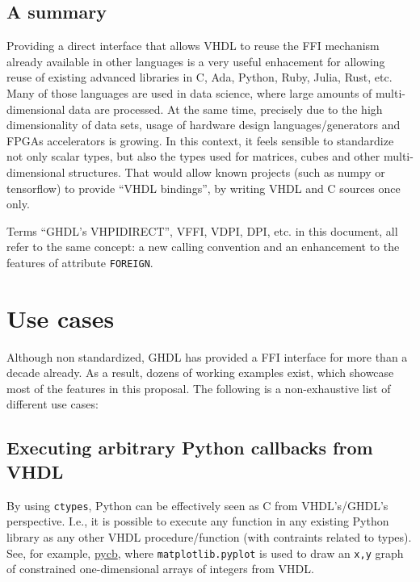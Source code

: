 \documentclass[
]{article}
\begin{document}
\hypertarget{a-summary}{%
\subsection{A summary}\label{a-summary}}

Providing a direct interface that allows VHDL to reuse the FFI mechanism already available in other languages is a very useful enhacement for allowing reuse of existing advanced libraries in C, Ada, Python, Ruby, Julia, Rust, etc. Many of those languages are used in data science, where large amounts of multi-dimensional data are processed. At the same time, precisely due to the high dimensionality of data sets, usage of hardware design languages/generators and FPGAs accelerators is growing. In this context, it feels sensible to standardize not only scalar types, but also the types used for matrices, cubes and other multi-dimensional structures. That would allow known projects (such as numpy or tensorflow) to provide ``VHDL bindings'', by writing VHDL and C sources once only.

Terms ``GHDL's VHPIDIRECT'', VFFI, VDPI, DPI, etc. in this document, all refer to the same concept: a new calling convention and an enhancement to the features of attribute \texttt{FOREIGN}.

\hypertarget{use-cases}{%
\section{Use cases}\label{use-cases}}

Although non standardized, GHDL has provided a FFI interface for more than a decade already. As a result, dozens of working examples exist, which showcase most of the features in this proposal. The following is a non-exhaustive list of different use cases:

\hypertarget{executing-arbitrary-python-callbacks-from-vhdl}{%
\subsection{Executing arbitrary Python callbacks from VHDL}\label{executing-arbitrary-python-callbacks-from-vhdl}}

By using \texttt{ctypes}, Python can be effectively seen as C from VHDL's/GHDL's perspective. I.e., it is possible to execute any function in any existing Python library as any other VHDL procedure/function (with contraints related to types). See, for example, \href{https://ghdl.github.io/ghdl-cosim/vhpidirect/examples/shared.html\#pycb}{pycb}, where \texttt{matplotlib.pyplot} is used to draw an \texttt{x,y} graph of constrained one-dimensional arrays of integers from VHDL.
\end{document}
